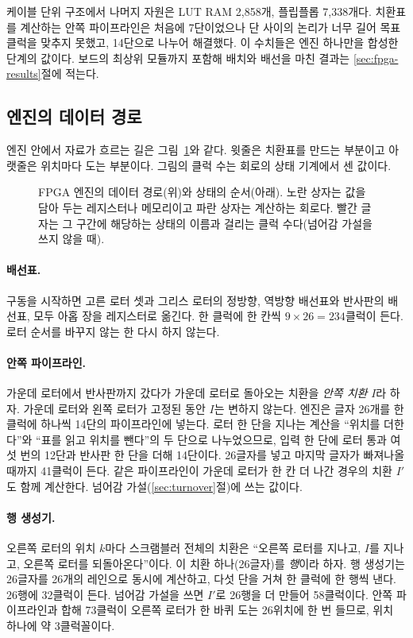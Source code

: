 케이블 단위 구조에서 나머지 자원은 LUT RAM 2,858개, 플립플롭 7,338개다. 치환표를 계산하는 안쪽
파이프라인은 처음에 7단이었으나 단 사이의 논리가 너무 길어 목표 클럭을 맞추지 못했고, 14단으로 나누어
해결했다. 이 수치들은 엔진 하나만을 합성한 단계의 값이다. 보드의 최상위 모듈까지 포함해 배치와 배선을 마친
결과는 \ref{sec:fpga-results}절에 적는다.

\subsection{엔진의 데이터 경로}\label{sec:fpga-datapath}

엔진 안에서 자료가 흐르는 길은 그림~\ref{fig:fpga-datapath}와 같다. 윗줄은 치환표를 만드는 부분이고 아랫줄은
위치마다 도는 부분이다. 그림의 클럭 수는 회로의 상태 기계에서 센 값이다.

\begin{figure}[ht]
\centering

\caption{FPGA 엔진의 데이터 경로(위)와 상태의 순서(아래). 노란 상자는 값을 담아 두는 레지스터나 메모리이고
파란 상자는 계산하는 회로다. 빨간 글자는 그 구간에 해당하는 상태의 이름과 걸리는 클럭 수다(넘어감 가설을
쓰지 않을 때).}
\label{fig:fpga-datapath}
\end{figure}

\paragraph{배선표.} 구동을 시작하면 고른 로터 셋과 그리스 로터의 정방향, 역방향 배선표와 반사판의 배선표, 모두
아홉 장을 레지스터로 옮긴다. 한 클럭에 한 칸씩 $9 \times 26 = 234$클럭이 든다. 로터 순서를 바꾸지 않는 한
다시 하지 않는다.

\paragraph{안쪽 파이프라인.} 가운데 로터에서 반사판까지 갔다가 가운데 로터로 돌아오는 치환을 \emph{안쪽 치환}
$I$라 하자. 가운데 로터와 왼쪽 로터가 고정된 동안 $I$는 변하지 않는다. 엔진은 글자 26개를 한 클럭에 하나씩
14단의 파이프라인에 넣는다. 로터 한 단을 지나는 계산을 ``위치를 더한다''와 ``표를 읽고 위치를 뺀다''의 두 단으로
나누었으므로, 입력 한 단에 로터 통과 여섯 번의 12단과 반사판 한 단을 더해 14단이다. 26글자를 넣고 마지막
글자가 빠져나올 때까지 41클럭이 든다. 같은 파이프라인이 가운데 로터가 한 칸 더 나간 경우의 치환 $I'$도 함께
계산한다. 넘어감 가설(\ref{sec:turnover}절)에 쓰는 값이다.

\paragraph{행 생성기.} 오른쪽 로터의 위치 $k$마다 스크램블러 전체의 치환은 ``오른쪽 로터를 지나고, $I$를
지나고, 오른쪽 로터를 되돌아온다''이다. 이 치환 하나(26글자)를 \emph{행}이라 하자. 행 생성기는 26글자를
26개의 레인으로 동시에 계산하고, 다섯 단을 거쳐 한 클럭에 한 행씩 낸다. 26행에 32클럭이 든다. 넘어감 가설을
쓰면 $I'$로 26행을 더 만들어 58클럭이다. 안쪽 파이프라인과 합해 73클럭이 오른쪽 로터가 한 바퀴 도는 26위치에
한 번 들므로, 위치 하나에 약 3클럭꼴이다.

